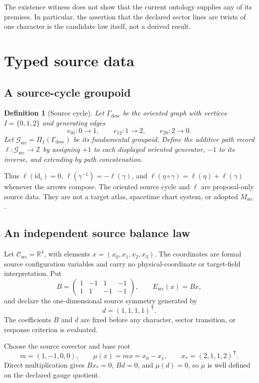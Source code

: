 \documentclass[11pt]{article}
\newtheorem{definition}{Definition}
\newcommand{\R}{\mathbb{R}}
\newcommand{\Gsrc}{\mathcal{G}_{\mathrm{src}}}
\newcommand{\Csrc}{\mathcal{C}_{\mathrm{src}}}
\begin{document}
The existence witness does not show that the current ontology supplies any of
its premises.  In particular, the assertion that the declared sector lines
are twists of one character is the candidate law itself, not a derived result.

\section{Typed source data}

\subsection{A source-cycle groupoid}

\begin{definition}[Source cycle]
Let $\Gamma_{\mathrm{desc}}$ be the oriented graph with vertices
$I=\{0,1,2\}$ and generating edges
\[
e_{01}:0\to1,\qquad e_{12}:1\to2,\qquad e_{20}:2\to0.
\]
Let $\Gsrc=\Pi_1(\Gamma_{\mathrm{desc}})$ be its fundamental groupoid.
Define the additive path record $\ell:\Gsrc\to\mathbb Z$ by assigning $+1$
to each displayed oriented generator, $-1$ to its inverse, and extending by
path concatenation.
\end{definition}

Thus $\ell(\mathrm{id}_i)=0$,
$\ell(\gamma^{-1})=-\ell(\gamma)$, and
$\ell(\eta\circ\gamma)=\ell(\eta)+\ell(\gamma)$ whenever the arrows compose.
The oriented source cycle and $\ell$ are proposal-only source data.  They are
not a target atlas, spacetime chart system, or adopted $M_{\mathrm{src}}$.

\subsection{An independent source balance law}

Let $\Csrc=\R^4$, with elements $x=(x_0,x_1,x_2,x_3)$.  The coordinates are
formal source configuration variables and carry no physical-coordinate or
target-field interpretation.  Put
\[
B=\begin{pmatrix}
1&-1&1&-1\\
1& 1&-1&-1
\end{pmatrix},\qquad
E_{\mathrm{src}}(x)=Bx,
\]
and declare the one-dimensional source symmetry generated by
\[
d=(1,1,1,1)^{\mathsf T}.
\]
The coefficients $B$ and $d$ are fixed before any character, sector
transition, or response criterion is evaluated.

Choose the source covector and base root
\[
m=(1,-1,0,0),\qquad
\mu(x)=m x=x_0-x_1,\qquad
x_*=(2,1,1,2)^{\mathsf T}.
\]
Direct multiplication gives $Bx_*=0$, $Bd=0$, and $\mu(d)=0$, so $\mu$ is
well defined on the declared gauge quotient.
\end{document}
